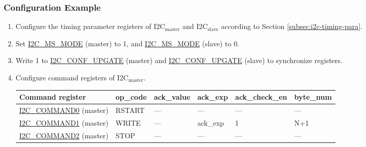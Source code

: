 \documentclass[main\_\_EN.tex]{subfiles}
\begin{document}
\subsubsection{Configuration Example}
\begin{enumerate}
\item Configure the timing parameter registers of I2C$_\text{master}$ and I2C$_\text{slave}$ according to Section \ref{subsec:i2c-timing-para}.
\item Set \hyperref[fielddesc:I2CMSMODE]{I2C\_MS\_MODE} (master) to 1, and \hyperref[fielddesc:I2CMSMODE]{I2C\_MS\_MODE} (slave) to 0.
\item Write 1 to \hyperref[fielddesc:I2CCONFUPGATE]{I2C\_CONF\_UPGATE} (master) and \hyperref[fielddesc:I2CCONFUPGATE]{I2C\_CONF\_UPGATE} (slave) to synchronize registers.
\item Configure command registers of I2C$_\text{master}$.

\begin{longtable}{ | p{4cm} | p{2cm} | p{2cm} | p{2cm} |p{2cm} | p{2cm} |}
\hline\rowcolor{lightgray}
Command register& op\_code & ack\_value&ack\_exp&ack\_check\_en&byte\_num  \\ \hline
\hyperref[fielddesc:I2CCOMMAND0]{I2C\_COMMAND0} (master)& RSTART& ---&---&---&---  \\ \hline
\hyperref[fielddesc:I2CCOMMAND1]{I2C\_COMMAND1} (master)& WRITE& ---&ack\_exp&1&N+1  \\ \hline
\hyperref[fielddesc:I2CCOMMAND2]{I2C\_COMMAND2} (master)& STOP& ---&---&---&---  \\ \hline
\end{longtable}


\end{enumerate}
\end{document}
